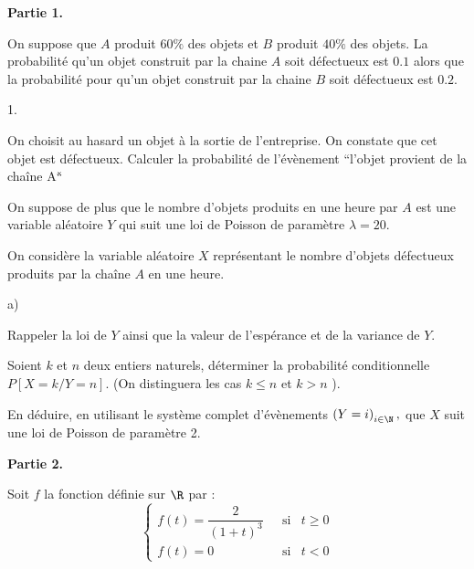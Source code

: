 \documentclass[11pt]{article}%
\begin{document}
\noindent \textbf{Partie 1.}

On suppose que $A$ produit $60\%$ des objets et $B$ produit $40\%$ des
objets. La probabilité qu'un objet construit par la chaine $A$ soit
défectueux est $0.1$ alors que la probabilité pour qu'un objet
construit par
la chaine $B$ soit défectueux est $0.2$.

\begin{noliste}{1.}
 \setlength{\itemsep}{4mm}
\item On choisit au hasard un objet à la sortie de l'entreprise. On
constate
que cet objet est défectueux. Calculer la probabilité de l'évènement
\textquotedblleft l'objet provient de la chaîne A\textquotedblleft\.

\item On suppose de plus que le nombre d'objets produits en une heure
par $A$
est une variable aléatoire $Y$ qui suit une loi de Poisson de paramètre
$\lambda = 20.$

On considère la variable aléatoire $X$ représentant le nombre d'objets
défectueux produits par la chaîne $A$ en une heure.

\begin{noliste}{a)}
 \setlength{\itemsep}{2mm}
\item Rappeler la loi de $Y$ ainsi que la valeur de l'espérance et de
la
variance de $Y$.

\item Soient $k$ et $n$ deux entiers naturels, déterminer la
probabilité
conditionnelle $P\left[ X = k/Y = n\right] $. (On distinguera les cas
$k\leq n$ et $k>n$ ).

\item En déduire, en utilisant le système complet d'évènements $\left(
Y = i\right)_{i\in \N},$ que $X$ suit une loi de Poisson de paramètre
2.
\end{noliste}
\end{noliste}

\noindent \textbf{Partie 2.}

\noindent Soit $f$ la fonction définie sur $\R$ par : 
\[
\left\{ 
\begin{array}{ccc}
f\left( t\right) = \dfrac{2}{\left( 1 + t\right) ^{3}}\text{ } &
\text{si} & 
t\geq 0 \\
f\left( t\right) = 0 & \text{si} & t<0
\end{array}
\right.
\]
\end{document}
